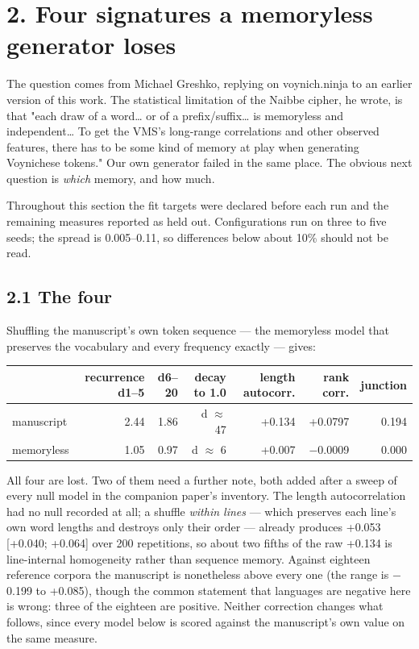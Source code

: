 \documentclass[11pt,a4paper]{article}
\begin{document}
\section*{2. Four signatures a memoryless generator loses}


The question comes from Michael Greshko, replying on voynich.ninja to an earlier version of this work. The statistical limitation of the Naibbe cipher, he wrote, is that "each draw of a word\ldots{} or of a prefix/suffix\ldots{} is memoryless and independent\ldots{} To get the VMS's long-range correlations and other observed features, there has to be some kind of memory at play when generating Voynichese tokens." Our own generator failed in the same place. The obvious next question is \emph{which} memory, and how much.


Throughout this section the fit targets were declared before each run and the remaining measures reported as held out. Configurations run on three to five seeds; the spread is 0.005--0.11, so differences below about 10\% should not be read.


\subsection*{2.1 The four}


Shuffling the manuscript's own token sequence --- the memoryless model that preserves the vocabulary and every frequency exactly --- gives:


\begin{table}[htbp]\centering\small
\begin{tabular}{@{}lrrrrrr@{}}
\toprule
 & recurrence d1--5 & d6--20 & decay to 1.0 & length autocorr. & rank corr. & junction \\
\midrule
manuscript & 2.44 & 1.86 & d $\approx$ 47 & +0.134 & +0.0797 & 0.194 \\
memoryless & 1.05 & 0.97 & d $\approx$ 6 & +0.007 & $-$0.0009 & 0.000 \\
\bottomrule
\end{tabular}
\end{table}


All four are lost. Two of them need a further note, both added after a sweep of every null model in the companion paper's inventory. The length autocorrelation had no null recorded at all; a shuffle \emph{within lines} --- which preserves each line's own word lengths and destroys only their order --- already produces +0.053 [+0.040; +0.064] over 200 repetitions, so about two fifths of the raw +0.134 is line-internal homogeneity rather than sequence memory. Against eighteen reference corpora the manuscript is nonetheless above every one (the range is $-$0.199 to +0.085), though the common statement that languages are negative here is wrong: three of the eighteen are positive. Neither correction changes what follows, since every model below is scored against the manuscript's own value on the same measure.
\end{document}
